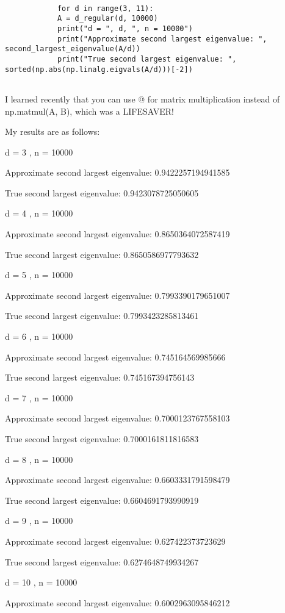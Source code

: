 \documentclass[12pt]{article}
\theoremstyle{definitionstyle}
\begin{document}
\begin{enumerate}[leftmargin=\labelsep]
\begin{lstlisting}
			
			for d in range(3, 11):
			A = d_regular(d, 10000)
			print("d = ", d, ", n = 10000")
			print("Approximate second largest eigenvalue: ", second_largest_eigenvalue(A/d))
			print("True second largest eigenvalue: ", sorted(np.abs(np.linalg.eigvals(A/d)))[-2])
			
		\end{lstlisting}
	
		I learned recently that you can use @ for matrix multiplication instead of np.matmul(A, B), which was a LIFESAVER!
		
		My results are as follows:
		
		d =  3 , n = 10000
		
		Approximate second largest eigenvalue:  0.9422257194941585
		
		True second largest eigenvalue:  0.9423078725050605
		
		d =  4 , n = 10000
		
		Approximate second largest eigenvalue:  0.8650364072587419
		
		True second largest eigenvalue:  0.8650586977793632
		
		d =  5 , n = 10000
		
		Approximate second largest eigenvalue:  0.7993390179651007
		
		True second largest eigenvalue:  0.7993423285813461
		
		d =  6 , n = 10000
		
		Approximate second largest eigenvalue:  0.745164569985666
		
		True second largest eigenvalue:  0.745167394756143
		
		d =  7 , n = 10000
		
		Approximate second largest eigenvalue:  0.7000123767558103
		
		True second largest eigenvalue:  0.7000161811816583
		
		d =  8 , n = 10000
		
		Approximate second largest eigenvalue:  0.6603331791598479
		
		True second largest eigenvalue:  0.6604691793990919
		
		d =  9 , n = 10000
		
		Approximate second largest eigenvalue:  0.627422373723629
		
		True second largest eigenvalue:  0.6274648749934267
		
		d =  10 , n = 10000
		
		Approximate second largest eigenvalue:  0.6002963095846212
		

\end{enumerate}
\end{document}
